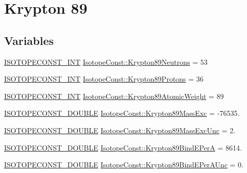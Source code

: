 \hypertarget{group___isotope_const-_krypton-_kr89}{}\section{Krypton 89}
\label{group___isotope_const-_krypton-_kr89}
\subsection*{Variables}
\begin{DoxyCompactItemize}
\item 
\mbox{\hyperlink{group___isotope_const-_macros_ga5f18360b3e99483a35c32d789e62621c}{I\+S\+O\+T\+O\+P\+E\+C\+O\+N\+S\+T\+\_\+\+I\+NT}} \mbox{\hyperlink{group___isotope_const-_krypton-_kr89_gaea777b9fd13bb0e86fea14b7248c7922}{Isotope\+Const\+::\+Krypton89\+Neutrons}} = 53
\item 
\mbox{\hyperlink{group___isotope_const-_macros_ga5f18360b3e99483a35c32d789e62621c}{I\+S\+O\+T\+O\+P\+E\+C\+O\+N\+S\+T\+\_\+\+I\+NT}} \mbox{\hyperlink{group___isotope_const-_krypton-_kr89_gaaacedd1d94d4d20ca6d428e715973489}{Isotope\+Const\+::\+Krypton89\+Protons}} = 36
\item 
\mbox{\hyperlink{group___isotope_const-_macros_ga5f18360b3e99483a35c32d789e62621c}{I\+S\+O\+T\+O\+P\+E\+C\+O\+N\+S\+T\+\_\+\+I\+NT}} \mbox{\hyperlink{group___isotope_const-_krypton-_kr89_ga4748f24202c41bd21d8fc33849bb593f}{Isotope\+Const\+::\+Krypton89\+Atomic\+Weight}} = 89
\item 
\mbox{\hyperlink{group___isotope_const-_macros_ga8f45a7272ce02c0b4c65c44636ed719a}{I\+S\+O\+T\+O\+P\+E\+C\+O\+N\+S\+T\+\_\+\+D\+O\+U\+B\+LE}} \mbox{\hyperlink{group___isotope_const-_krypton-_kr89_gab046babc62d8595e7c61c50d4656b72e}{Isotope\+Const\+::\+Krypton89\+Mass\+Exc}} = -\/76535.
\item 
\mbox{\hyperlink{group___isotope_const-_macros_ga8f45a7272ce02c0b4c65c44636ed719a}{I\+S\+O\+T\+O\+P\+E\+C\+O\+N\+S\+T\+\_\+\+D\+O\+U\+B\+LE}} \mbox{\hyperlink{group___isotope_const-_krypton-_kr89_ga15a2776ac7f43adc00bb6a8797f9783c}{Isotope\+Const\+::\+Krypton89\+Mass\+Exc\+Unc}} = 2.
\item 
\mbox{\hyperlink{group___isotope_const-_macros_ga8f45a7272ce02c0b4c65c44636ed719a}{I\+S\+O\+T\+O\+P\+E\+C\+O\+N\+S\+T\+\_\+\+D\+O\+U\+B\+LE}} \mbox{\hyperlink{group___isotope_const-_krypton-_kr89_gad6aeb49ee2d7401018c91755bb9c5211}{Isotope\+Const\+::\+Krypton89\+Bind\+E\+PerA}} = 8614.
\item 
\mbox{\hyperlink{group___isotope_const-_macros_ga8f45a7272ce02c0b4c65c44636ed719a}{I\+S\+O\+T\+O\+P\+E\+C\+O\+N\+S\+T\+\_\+\+D\+O\+U\+B\+LE}} \mbox{\hyperlink{group___isotope_const-_krypton-_kr89_gaee6e08e6c0191ab7de507617b23caacc}{Isotope\+Const\+::\+Krypton89\+Bind\+E\+Per\+A\+Unc}} = 0.

\end{DoxyCompactItemize}
